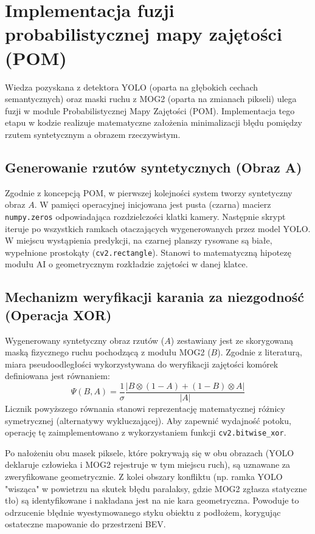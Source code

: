 \section{Implementacja fuzji probabilistycznej mapy zajętości (POM)}

Wiedza pozyskana z detektora YOLO (oparta na głębokich cechach semantycznych) oraz maski ruchu z
MOG2 (oparta na zmianach pikseli) ulega fuzji w module Probabilistycznej Mapy Zajętości (POM).
Implementacja tego etapu w kodzie realizuje matematyczne założenia minimalizacji błędu pomiędzy
rzutem syntetycznym a obrazem rzeczywistym.

\subsection{Generowanie rzutów syntetycznych (Obraz A)}

Zgodnie z koncepcją POM, w pierwszej kolejności system tworzy syntetyczny obraz $A$. W pamięci
operacyjnej inicjowana jest pusta (czarna) macierz \texttt{numpy.zeros} odpowiadająca
rozdzielczości klatki kamery. Następnie skrypt iteruje po wszystkich ramkach otaczających
wygenerowanych przez model YOLO. W miejscu wystąpienia predykcji, na czarnej planszy rysowane są
białe, wypełnione prostokąty (\texttt{cv2.rectangle}). Stanowi to matematyczną hipotezę modułu AI o
geometrycznym rozkładzie zajętości w danej klatce.

\subsection{Mechanizm weryfikacji karania za niezgodność (Operacja XOR)}

Wygenerowany syntetyczny obraz rzutów ($A$) zestawiany jest ze skorygowaną maską fizycznego ruchu
pochodzącą z modułu MOG2 ($B$). Zgodnie z literaturą, miara pseudoodległości wykorzystywana do
weryfikacji zajętości komórek definiowana jest równaniem: $$ \Psi(B,A) = \frac{1}{\sigma} \frac{|B
    \otimes (1 - A) + (1 - B) \otimes A|}{|A|} $$ Licznik powyższego równania stanowi reprezentację
matematycznej różnicy symetrycznej (alternatywy wykluczającej). Aby zapewnić wydajność potoku,
operację tę zaimplementowano z wykorzystaniem funkcji \texttt{cv2.bitwise\_xor}.

Po nałożeniu obu masek piksele, które pokrywają się w obu obrazach (YOLO deklaruje człowieka i MOG2
rejestruje w tym miejscu ruch), są uznawane za zweryfikowane geometrycznie. Z kolei obszary
konfliktu (np. ramka YOLO "wisząca" w powietrzu na skutek błędu paralaksy, gdzie MOG2 zgłasza
statyczne tło) są identyfikowane i nakładana jest na nie kara geometryczna. Powoduje to odrzucenie
błędnie wyestymowanego styku obiektu z podłożem, korygując ostateczne mapowanie do przestrzeni BEV.

